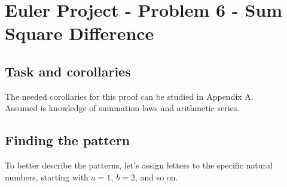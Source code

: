 \documentclass[]{article}
\begin{document}
\allowdisplaybreaks
\raggedbottom

\section*{Euler Project - Problem 6 - Sum Square Difference}
\subsection*{Task and corollaries}

\vspace{10pt}
\noindent The needed corollaries for this proof can be studied in Appendix A.\\Assumed is knowledge of summation laws and arithmetic series.

\subsection*{Finding the pattern}
To better describe the patterns, let's assign letters to the specific natural numbers, starting with $a=1$, $b=2$, and so on.\\
\end{document}
